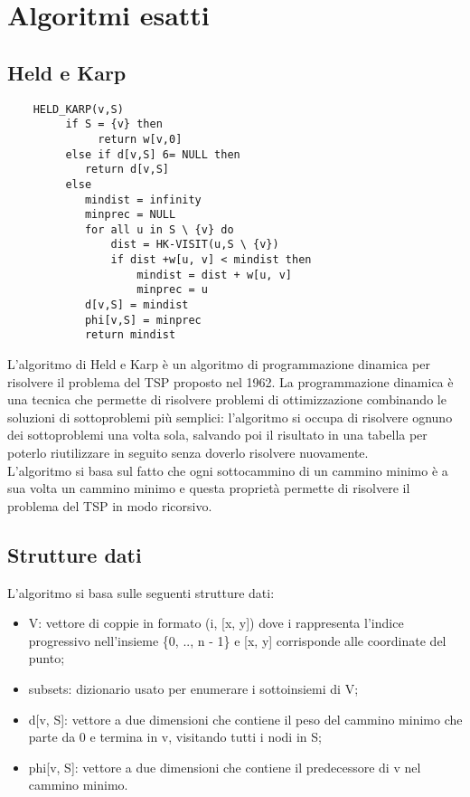 \section{Algoritmi esatti}\label{prim}
\subsection{Held e Karp}
\begin{lstlisting}
	HELD_KARP(v,S)
		 if S = {v} then
		 	  return w[v,0]   
		 else if d[v,S] 6= NULL then
		 	return d[v,S]
		 else
		 	mindist = infinity
		 	minprec = NULL
		 	for all u in S \ {v} do 
		 		dist = HK-VISIT(u,S \ {v})
		 		if dist +w[u, v] < mindist then
		 			mindist = dist + w[u, v]
		 			minprec = u
		 	d[v,S] = mindist
		 	phi[v,S] = minprec  
		 	return mindist                      
\end{lstlisting}

L’algoritmo di Held e Karp è un algoritmo di programmazione dinamica per risolvere il problema del TSP proposto nel 1962. La programmazione dinamica è una tecnica che permette di risolvere problemi di ottimizzazione
combinando le soluzioni di sottoproblemi più semplici: l'algoritmo si occupa di risolvere ognuno dei sottoproblemi una volta sola, salvando poi il risultato in una tabella per poterlo riutilizzare in seguito senza doverlo risolvere nuovamente. \\
L'algoritmo si basa sul fatto che ogni sottocammino di un cammino minimo è a sua volta un cammino minimo e questa proprietà permette di risolvere il problema del TSP in modo ricorsivo.

\subsection{Strutture dati}
L'algoritmo si basa sulle seguenti strutture dati:
\begin{itemize}
	\item V: vettore di coppie in formato (i, [x, y]) dove i rappresenta l'indice progressivo nell'insieme \{0, .., n - 1\} e [x, y] corrisponde alle coordinate del punto;
	\item subsets: dizionario usato per enumerare i sottoinsiemi di V;
	\item d[v, S]: vettore a due dimensioni che contiene il peso del cammino minimo che parte da 0 e termina in v, visitando tutti i nodi in S;
	\item phi[v, S]: vettore a due dimensioni che contiene il predecessore di v nel cammino minimo.
\end{itemize}




